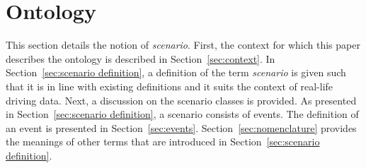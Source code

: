 \section{Ontology}
\label{sec:ontology}

This section details the notion of \emph{scenario}. First, the context for which this paper describes the ontology is described in Section~\ref{sec:context}. In Section~\ref{sec:scenario definition}, a definition of the term \emph{scenario} is given such that it is in line with existing definitions and it suits the context of real-life driving data. Next, a discussion on the scenario classes is provided. As presented in Section~\ref{sec:scenario definition}, a scenario consists of events. The definition of an event is presented in Section~\ref{sec:events}. Section~\ref{sec:nomenclature} provides the meanings of other terms that are introduced in Section~\ref{sec:scenario definition}.





